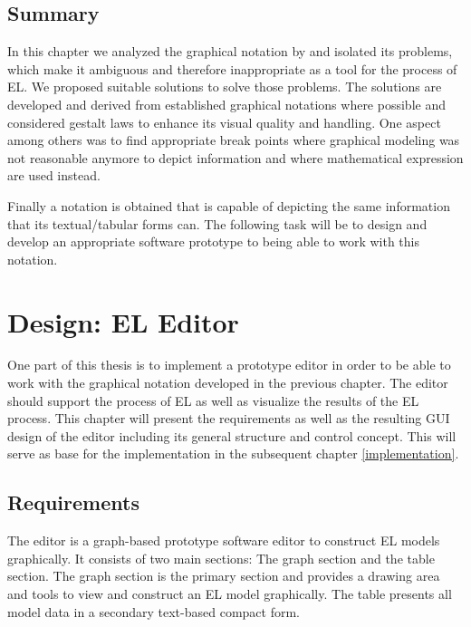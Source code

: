\documentclass[twoside, openright, 12pt]{book}
\begin{document}
\section{Summary}
\label{gsl_summary}
In this chapter we analyzed the graphical notation by \cite{Amthor18} and isolated its problems, which make it ambiguous and therefore inappropriate as a tool for the process of EL.
We proposed suitable solutions to solve those problems.
The solutions are developed and derived from established graphical notations where possible and considered gestalt laws to enhance its visual quality and handling.
One aspect among others was to find appropriate break points where graphical modeling was not reasonable anymore to depict information and where mathematical expression are used instead.

Finally a notation is obtained that is capable of depicting the same information that its textual/tabular forms can.
The following task will be to design and develop an appropriate software prototype to being able to work with this notation.





\cleardoublepage
\chapter{Design: EL Editor}
\label{editor_design}
One part of this thesis is to implement a prototype editor in order to be able to work with the graphical notation developed in the previous chapter.
The editor should support the process of EL as well as visualize the results of the EL process.
This chapter will present the requirements as well as the resulting GUI design of the editor including its general structure and control concept.
This will serve as base for the implementation in the subsequent chapter \ref{implementation}.




\section{Requirements}
\label{editor_requirements}
The editor is a graph-based prototype software editor to construct EL models graphically.
It consists of two main sections: The graph section and the table section.
The graph section is the primary section and provides a drawing area and tools to view and construct an EL model graphically.
The table presents all model data in a secondary text-based compact form.
\end{document}
